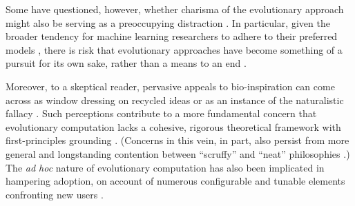 Some have questioned, however, whether charisma of the evolutionary approach might also be serving as a preoccupying distraction \citep{moore2023evolution,sorensen2015metaheuristics}.
In particular, given the broader tendency for machine learning researchers to adhere to their preferred models \citep{domingos2012few}, there is risk that evolutionary approaches have become something of a pursuit for its own sake, rather than a means to an end \citep{woodward2016gp,yampolskiy2018we}.


Moreover, to a skeptical reader, pervasive appeals to bio-inspiration can come across as window dressing on recycled ideas or as an instance of the naturalistic fallacy \citep{wortmann2020does,sorensen2015metaheuristics}.
Such perceptions contribute to a more fundamental concern that evolutionary computation lacks a cohesive, rigorous theoretical framework with first-principles grounding \citep{worzel2003genetic}.
(Concerns in this vein, in part, also persist from more general and longstanding contention between ``scruffy'' and ``neat'' philosophies \citep[p.~16]{jones2008artificial, minsky1991logical}.)
The \textit{ad hoc} nature of evolutionary computation has also been implicated in hampering adoption, on account of numerous configurable and tunable elements confronting new users \citep{oneil2010open}.

